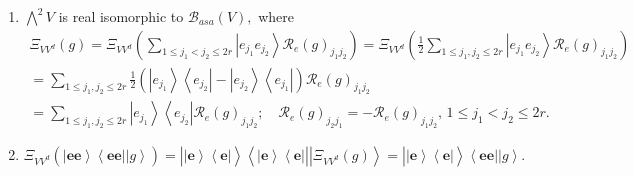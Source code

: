\documentclass[aps,preprint]{revtex4}%
\begin{document}
\begin{enumerate}
\item $%
{\textstyle\bigwedge\nolimits^{2}}
V$ is real isomorphic to $\mathcal{B}_{asa}\left(  V\right)  ,$ where%
\begin{gather}
\Xi_{VV^{d}}\left(  g\right)  =\Xi_{VV^{d}}\left(  \sum_{1\leq j_{1}<j_{2}%
\leq2r}\left\vert e_{j_{1}}e_{j_{2}}\right\rangle \mathcal{R}_{e}\left(
g\right)  _{j_{1}j_{2}}\right)  =\Xi_{VV^{d}}\left(  \frac{1}{2}\sum_{1\leq
j_{1},j_{2}\leq2r}\left\vert e_{j_{1}}e_{j_{2}}\right\rangle \mathcal{R}%
_{e}\left(  g\right)  _{j_{1}j_{2}}\right) \\
=\sum_{1\leq j_{1},j_{2}\leq2r}\frac{1}{2}\left(  \left\vert e_{j_{1}%
}\right\rangle \left\langle e_{j_{2}}\right\vert -\left\vert e_{j_{2}%
}\right\rangle \left\langle e_{j_{1}}\right\vert \right)  \mathcal{R}%
_{e}\left(  g\right)  _{j_{1}j_{2}}\\
=\sum_{1\leq j_{1},j_{2}\leq2r}\left\vert e_{j_{1}}\right\rangle \left\langle
e_{j_{2}}\right\vert \mathcal{R}_{e}\left(  g\right)  _{j_{1}j_{2}}%
;\quad\mathcal{R}_{e}\left(  g\right)  _{j_{2}j_{1}}=-\mathcal{R}_{e}\left(
g\right)  _{j_{1}j_{2}},\,1\leq j_{1}<j_{2}\leq2r.
\end{gather}


\item
\begin{equation}
\Xi_{VV^{d}}\left(  \overset{}{\left\vert \mathbf{ee}\right\rangle
\left\langle \mathbf{ee}\right\vert \left\vert g\right\rangle }\right)
=\left\vert \overset{}{\left\vert \mathbf{e}\right\rangle \left\langle
\mathbf{e}\right\vert }\right\rangle \left\langle \overset{}{\left\vert
\mathbf{e}\right\rangle \left\langle \mathbf{e}\right\vert }\right\vert
\left\vert \overset{}{\Xi_{VV^{d}}\left(  g\right)  }\right\rangle =\left\vert
\overset{}{\left\vert \mathbf{e}\right\rangle \left\langle \mathbf{e}%
\right\vert }\right\rangle \left\langle \overset{}{\mathbf{ee}}\right\vert
\left\vert \overset{}{g}\right\rangle .
\end{equation}



\end{enumerate}
\end{document}
